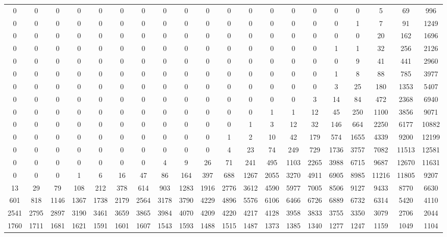  \begin{tabular}{ | * {20}{c} | } 
0 & 0 & 0 & 0 & 0 & 0 & 0 & 0 & 0 & 0 & 0 & 0 & 0 & 0 & 0 & 0 & 0 & 5 & 69 & 996 \\ 
0 & 0 & 0 & 0 & 0 & 0 & 0 & 0 & 0 & 0 & 0 & 0 & 0 & 0 & 0 & 0 & 1 & 7 & 91 & 1249 \\ 
0 & 0 & 0 & 0 & 0 & 0 & 0 & 0 & 0 & 0 & 0 & 0 & 0 & 0 & 0 & 0 & 0 & 20 & 162 & 1696 \\ 
0 & 0 & 0 & 0 & 0 & 0 & 0 & 0 & 0 & 0 & 0 & 0 & 0 & 0 & 0 & 1 & 1 & 32 & 256 & 2126 \\ 
0 & 0 & 0 & 0 & 0 & 0 & 0 & 0 & 0 & 0 & 0 & 0 & 0 & 0 & 0 & 0 & 9 & 41 & 441 & 2960 \\ 
0 & 0 & 0 & 0 & 0 & 0 & 0 & 0 & 0 & 0 & 0 & 0 & 0 & 0 & 0 & 1 & 8 & 88 & 785 & 3977 \\ 
0 & 0 & 0 & 0 & 0 & 0 & 0 & 0 & 0 & 0 & 0 & 0 & 0 & 0 & 0 & 3 & 25 & 180 & 1353 & 5407 \\ 
0 & 0 & 0 & 0 & 0 & 0 & 0 & 0 & 0 & 0 & 0 & 0 & 0 & 0 & 3 & 14 & 84 & 472 & 2368 & 6940 \\ 
0 & 0 & 0 & 0 & 0 & 0 & 0 & 0 & 0 & 0 & 0 & 0 & 1 & 1 & 12 & 45 & 250 & 1100 & 3856 & 9071 \\ 
0 & 0 & 0 & 0 & 0 & 0 & 0 & 0 & 0 & 0 & 0 & 1 & 3 & 12 & 32 & 146 & 664 & 2250 & 6177 & 10882 \\ 
0 & 0 & 0 & 0 & 0 & 0 & 0 & 0 & 0 & 0 & 1 & 2 & 10 & 42 & 179 & 574 & 1655 & 4339 & 9200 & 12199 \\ 
0 & 0 & 0 & 0 & 0 & 0 & 0 & 0 & 0 & 0 & 4 & 23 & 74 & 249 & 729 & 1736 & 3757 & 7082 & 11513 & 12581 \\ 
0 & 0 & 0 & 0 & 0 & 0 & 0 & 4 & 9 & 26 & 71 & 241 & 495 & 1103 & 2265 & 3988 & 6715 & 9687 & 12670 & 11631 \\ 
0 & 0 & 0 & 1 & 6 & 16 & 47 & 86 & 164 & 397 & 688 & 1267 & 2055 & 3270 & 4911 & 6905 & 8985 & 11216 & 11805 & 9207 \\ 
13 & 29 & 79 & 108 & 212 & 378 & 614 & 903 & 1283 & 1916 & 2776 & 3612 & 4590 & 5977 & 7005 & 8506 & 9127 & 9433 & 8770 & 6630 \\ 
601 & 818 & 1146 & 1367 & 1738 & 2179 & 2564 & 3178 & 3790 & 4229 & 4896 & 5576 & 6106 & 6466 & 6726 & 6889 & 6732 & 6314 & 5420 & 4110 \\ 
2541 & 2795 & 2897 & 3190 & 3461 & 3659 & 3865 & 3984 & 4070 & 4209 & 4220 & 4217 & 4128 & 3958 & 3833 & 3755 & 3350 & 3079 & 2706 & 2044 \\ 
1760 & 1711 & 1681 & 1621 & 1591 & 1601 & 1607 & 1543 & 1593 & 1488 & 1515 & 1487 & 1373 & 1385 & 1340 & 1277 & 1247 & 1159 & 1049 & 1104 \\ 
 \end{tabular} 
